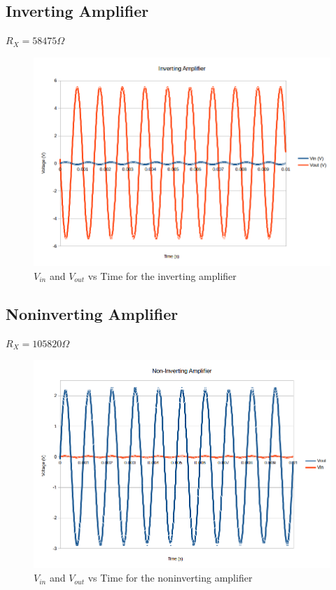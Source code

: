 \documentclass[10pt]{article}
\begin{document}
\subsection*{Inverting Amplifier}
$R_X = 58475 \Omega$
\begin{figure}[H]
	\centering
	\includegraphics[width=\textwidth]{InvertingAmp.png}
	\caption{$V_{in}$ and $V_{out}$ vs Time for the inverting amplifier}
\end{figure}

\subsection*{Noninverting Amplifier}
$R_X = 105820 \Omega$
\begin{figure}[H]
	\centering
	\includegraphics[width=\textwidth]{NonInvertingAmp.png}
	\caption{$V_{in}$ and $V_{out}$ vs Time for the noninverting amplifier}
\end{figure}
\end{document}

